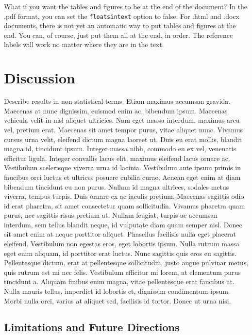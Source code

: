 \documentclass[
  man,
  floatsintext,
  longtable,
  nolmodern,
  notxfonts,
  notimes,
  mask,
  colorlinks=true,linkcolor=blue,citecolor=blue,urlcolor=blue]{apa7}
\begin{document}
What if you want the tables and figures to be at the end of the
document? In the .pdf format, you can set the \texttt{floatsintext}
option to false. For .html and .docx documents, there is not yet an
automatic way to put tables and figures at the end. You can, of course,
just put them all at the end, in order. The reference labels will work
no matter where they are in the text.

\section{Discussion}\label{discussion}

Describe results in non-statistical terms. Etiam maximus accumsan
gravida. Maecenas at nunc dignissim, euismod enim ac, bibendum ipsum.
Maecenas vehicula velit in nisl aliquet ultricies. Nam eget massa
interdum, maximus arcu vel, pretium erat. Maecenas sit amet tempor
purus, vitae aliquet nunc. Vivamus cursus urna velit, eleifend dictum
magna laoreet ut. Duis eu erat mollis, blandit magna id, tincidunt
ipsum. Integer massa nibh, commodo eu ex vel, venenatis efficitur
ligula. Integer convallis lacus elit, maximus eleifend lacus ornare ac.
Vestibulum scelerisque viverra urna id lacinia. Vestibulum ante ipsum
primis in faucibus orci luctus et ultrices posuere cubilia curae; Aenean
eget enim at diam bibendum tincidunt eu non purus. Nullam id magna
ultrices, sodales metus viverra, tempus turpis. Duis ornare ex ac
iaculis pretium. Maecenas sagittis odio id erat pharetra, sit amet
consectetur quam sollicitudin. Vivamus pharetra quam purus, nec sagittis
risus pretium at. Nullam feugiat, turpis ac accumsan interdum, sem
tellus blandit neque, id vulputate diam quam semper nisl. Donec sit amet
enim at neque porttitor aliquet. Phasellus facilisis nulla eget placerat
eleifend. Vestibulum non egestas eros, eget lobortis ipsum. Nulla rutrum
massa eget enim aliquam, id porttitor erat luctus. Nunc sagittis quis
eros eu sagittis. Pellentesque dictum, erat at pellentesque
sollicitudin, justo augue pulvinar metus, quis rutrum est mi nec felis.
Vestibulum efficitur mi lorem, at elementum purus tincidunt a. Aliquam
finibus enim magna, vitae pellentesque erat faucibus at. Nulla mauris
tellus, imperdiet id lobortis et, dignissim condimentum ipsum. Morbi
nulla orci, varius at aliquet sed, facilisis id tortor. Donec ut urna
nisi.

\subsection{Limitations and Future
Directions}\label{limitations-and-future-directions}
\end{document}
